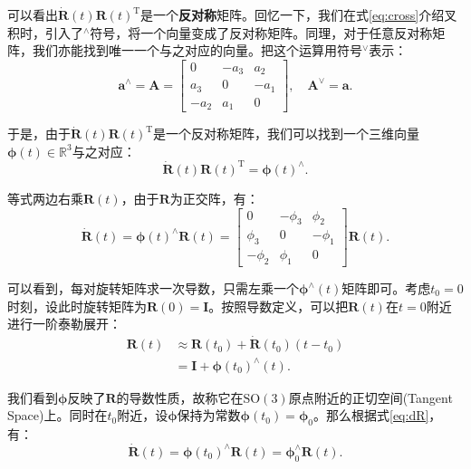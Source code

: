 可以看出$\bm{\dot{R}} (t) \bm{R} {(t)^\mathrm{T}}$是一个\textbf{反对称}矩阵。回忆一下，我们在式\eqref{eq:cross}介绍叉积时，引入了$^\wedge$符号，将一个向量变成了反对称矩阵。同理，对于任意反对称矩阵，我们亦能找到唯一一个与之对应的向量。把这个运算用符号$^{\vee}$表示：
\begin{equation}
{\bm{a}^ \wedge } = \bm{A} = \left[ {\begin{array}{*{20}{c}}
	0&{ - {a_3}}&{{a_2}}\\
	{{a_3}}&0&{ - {a_1}}\\
	{ - {a_2}}&{{a_1}}&0
	\end{array}} \right], \quad 
{ \bm{A}^ \vee } = \bm{a}.
\end{equation}

于是，由于$\bm{\dot{R}} (t) \bm{R} {(t)^\mathrm{T}}$是一个反对称矩阵，我们可以找到一个三维向量$\boldsymbol{\phi} (t) \in \mathbb{R}^3$与之对应：
\[
  \bm{ \dot{R} } (t) \bm{R}(t)^\mathrm{T} = \boldsymbol{\phi} (t) ^ {\wedge}.
\]

等式两边右乘$\bm{R}(t)$，由于$\bm{R}$为正交阵，有：
\begin{equation}
\label{eq:dR}
  \bm{ \dot{R} } (t)  = \boldsymbol{\phi} (t)^{\wedge} \bm{R}(t) = 
 \left[ {\begin{array}{*{20}{c}}
  	0&{ - {\phi _3}}&{{\phi _2}}\\
  	{{\phi _3}}&0&{ - {\phi _1}}\\
  	{ - {\phi _2}}&{{\phi _1}}&0
  	\end{array}} \right] \bm{R} (t).
\end{equation}

可以看到，每对旋转矩阵求一次导数，只需左乘一个$\boldsymbol{\phi}^\wedge (t)$矩阵即可。考虑$t_0=0$时刻，设此时旋转矩阵为$\bm{R}(0) = \bm{I}$。按照导数定义，可以把$\bm{R}(t)$在$t=0$附近进行一阶泰勒展开：
\begin{equation}
\begin{aligned}
\bm{R} \left( t \right) & \approx \bm{R} \left( t_0 \right) + \dot {\bm{R}} \left( {{t_0}} \right)\left( {t - {t_0}} \right)\\
&= \bm{I} + \boldsymbol{\phi} {\left( {{t_0}} \right)^ \wedge } \left( t \right).
\end{aligned}
\end{equation}

我们看到$\boldsymbol{\phi}$反映了$\bm{R}$的导数性质，故称它在$\mathrm{SO}(3)$原点附近的正切空间(Tangent Space)上。同时在$t_0$附近，设$\boldsymbol{\phi}$保持为常数$\boldsymbol{\phi}(t_0) = \boldsymbol{\phi}_0$。那么根据式\eqref{eq:dR}，有：
\[
\bm{ \dot{R} } (t) = \boldsymbol{\phi} (t_0) ^ {\wedge} \bm{R}(t) = \boldsymbol{\phi}_0^ {\wedge} \bm{R}(t).
\]

